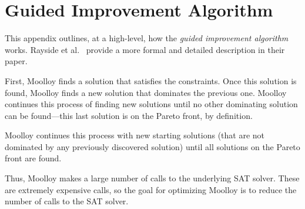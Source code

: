 \documentclass[11pt]{article}
\theoremstyle{definition}
\begin{document}
\appendix

\section{Guided Improvement Algorithm}\label{app:impl}

This appendix outlines, at a high-level, how the \textit{guided
improvement algorithm} works. Rayside et al.~\cite{ref:Rayside09}
provide a more formal and detailed description in their paper.

First, Moolloy finds a solution that satisfies the constraints. Once
this solution is found, Moolloy finds a new solution that dominates the
previous one. Moolloy continues this process of finding new solutions
until no other dominating solution can be found---this last solution is
on the Pareto front, by definition.

Moolloy continues this process with new starting solutions (that are
not dominated by any previously discovered solution) until all
solutions on the Pareto front are found.

Thus, Moolloy makes a large number of calls to the underlying SAT
solver. These are extremely expensive calls, so the goal for optimizing
Moolloy is to reduce the number of calls to the SAT solver.




\end{document}
